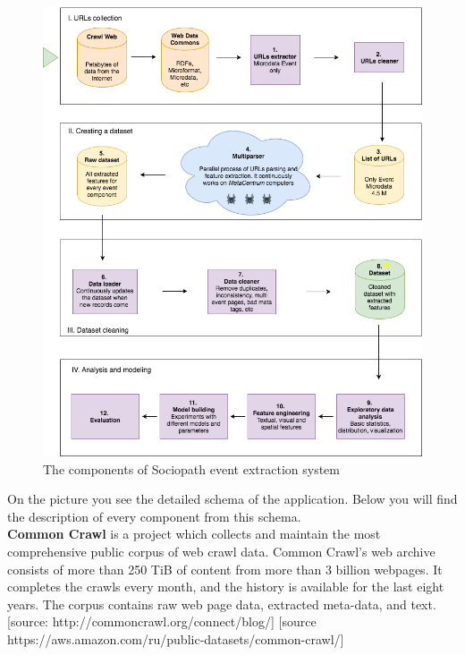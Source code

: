 \begin{figure}[h]
\begin{center}
\includegraphics[width=1.0\textwidth]{figures04/Architecure}
\caption{The components of Sociopath event extraction system}
\label{fig:architecture}
\end{center}
\end{figure}

On the picture  you see the detailed schema of the application. Below you will find the description of every component from this schema.\\

\textbf{Common Crawl} is a project which collects and maintain the most comprehensive public corpus of web crawl data. Common Crawl's web archive consists of more than 250 TiB of content from more than 3 billion webpages. It completes the crawls every month, and the history is available for the last eight years. The corpus contains raw web page data, extracted meta-data, and text.
[source: http://commoncrawl.org/connect/blog/]
[source https://aws.amazon.com/ru/public-datasets/common-crawl/]\\

